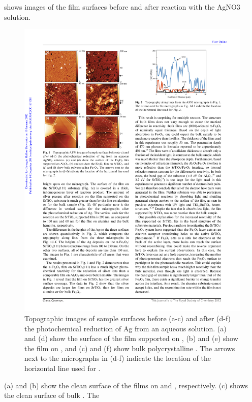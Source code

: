  shows  images of the film surfaces before and after
reaction with the AgNO3 solution.  
\begin{figure}
	\includegraphics[width=\textwidth]{thinfilmresults.pdf}
	\caption[Images of thin film surfaces after reaction]{%
		Topographic  images of sample surfaces before (a-c) and 
		after (d-f) the photochemical reduction of Ag from an aqueous 
		 solution. (a) and (d) show the surface of the 
		 film supported on , (b) and (e) show 
		the  film on , and (c) and (f) show bulk 
		polycrystalline . The arrows next to the micrographs 
		in (d-f) indicate the location of the horizontal line used for 
		.}
	\label{fig:thinfilmresults}
\end{figure}
(a) and (b) show the clean surface
of the  films on  and , respectively. 
(c) shows the clean surface of bulk . The
